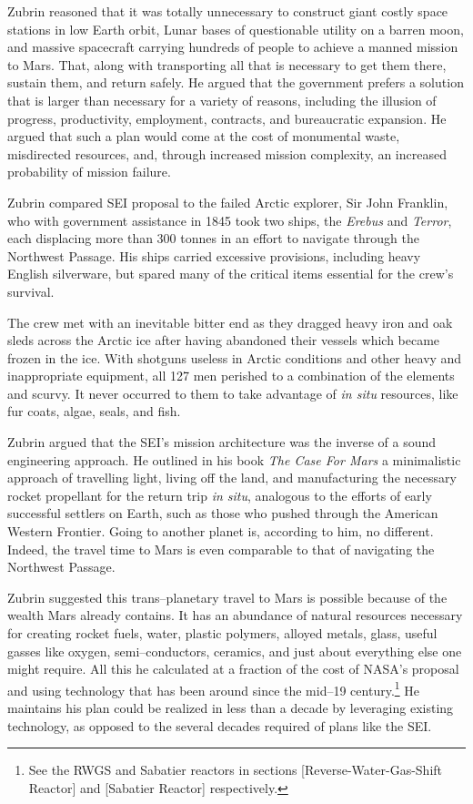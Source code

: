 Zubrin reasoned that it was totally unnecessary to construct giant costly space stations in low Earth orbit, Lunar bases of questionable utility on a barren moon, and massive spacecraft carrying hundreds of people to achieve a manned mission to Mars. That, along with transporting all that is necessary to get them there, sustain them, and return safely. He argued that the government prefers a solution that is larger than necessary for a variety of reasons, including the illusion of progress, productivity, employment, contracts, and bureaucratic expansion. He argued that such a plan would come at the cost of monumental waste, misdirected resources, and, through increased mission complexity, an increased probability of mission failure.

Zubrin compared SEI proposal to the failed Arctic explorer, Sir John Franklin, who with government assistance in 1845 took two ships, the {\it Erebus} and {\it Terror}, each displacing more than 300 tonnes in an effort to navigate through the Northwest Passage. His ships carried excessive provisions, including heavy English silverware, but spared many of the critical items essential for the crew's survival.

The crew met with an inevitable bitter end as they dragged heavy iron and oak sleds across the Arctic ice after having abandoned their vessels which became frozen in the ice. With shotguns useless in Arctic conditions and other heavy and inappropriate equipment, all 127 men perished to a combination of the elements and scurvy. It never occurred to them to take advantage of {\it in situ} resources, like fur coats, algae, seals, and fish.

Zubrin argued that the SEI's mission architecture was the inverse of a sound engineering approach. He outlined in his book {\it The Case For Mars} a minimalistic approach of travelling light, living off the land, and manufacturing the necessary rocket propellant for the return trip {\it in situ}, analogous to the efforts of early successful settlers on Earth, such as those who pushed through the American Western Frontier. Going to another planet is, according to him, no different. Indeed, the travel time to Mars is even comparable to that of navigating the Northwest Passage.

Zubrin suggested this trans--planetary travel to Mars is possible because of the wealth Mars already contains. It has an abundance of natural resources necessary for creating rocket fuels, water, plastic polymers, alloyed metals, glass, useful gasses like oxygen, semi--conductors, ceramics, and just about everything else one might require. All this he calculated at a fraction of the cost of NASA's proposal and using technology that has been around since the mid--19 century.\footnote{See the RWGS and Sabatier reactors in sections \in{}[Reverse-Water-Gas-Shift Reactor] and \in{}[Sabatier Reactor] respectively.} He maintains his plan could be realized in less than a decade by leveraging existing technology, as opposed to the several decades required of plans like the SEI.

